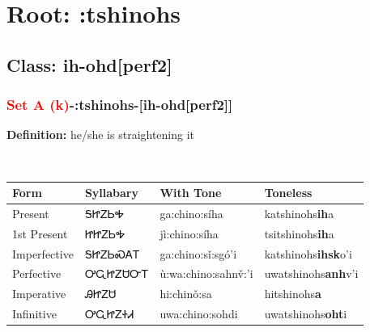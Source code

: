 \needspace{4in}
\section*{Root: :tshinohs}
\nopagebreak
{}
\needspace{3in}
\subsection*{Class: ih-ohd[perf2]}
\nopagebreak
\needspace{2in}
\subsubsection*{\textcolor{Red}{Set A (k)}{-}\textbf{:tshinohs}{-}[ih-ohd[perf2]]}
\nopagebreak
\textbf{Definition: } he/she is straightening it
\\[0.5em]
\begin{tabularx}{\textwidth}{l X X X}%
\toprule%
\textbf{Form}&\textbf{Syllabary}&\textbf{With Tone}&\textbf{Toneless}\\%
\midrule%
Present&ᎦᏥᏃᏏᎭ&ga:chino:síha&katshinohs\textbf{ih}a\\%
1st Present&ᏥᏥᏃᏏᎭ&jì:chino:síha&tsitshinohs\textbf{ih}a\\%
Imperfective&ᎦᏥᏃᏏᏍᎪᎢ&ga:chino:sǐ:sgó’i&katshinohs\textbf{ihsk}o'i\\%
Perfective&ᎤᏩᏥᏃᏌᏅᎢ&ù:wa:chino:sahnv̌:’i&uwatshinohs\textbf{anh}v'i\\%
Imperative&ᎯᏥᏃᏌ&hi:chinǒ:sa&hitshinohs\textbf{a}\\%
Infinitive&ᎤᏩᏥᏃᏐᏗ&uwa:chino:sohdi&uwatshinohs\textbf{oht}i\\%
\bottomrule%
\end{tabularx}
\\[1em]